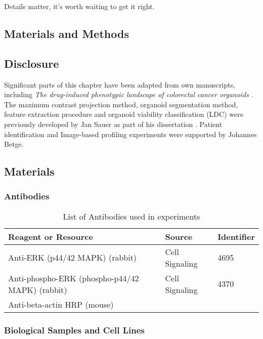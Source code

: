 \begin{savequote}[75mm]
Details matter, it’s worth waiting to get it right.
\end{savequote}

\begin{flushleft}

\chapter{Materials and Methods}

\section{Disclosure}
Significant parts of this chapter have been adapted from own manuscripts, including \textit{The drug-induced phenotypic landscape of colorectal cancer organoids} \cite{Betge2022-kr}. The maximum contrast projection method, organoid segmentation method, feature extraction procedure and organoid viability classification (LDC) were previously developed by Jan Sauer as part of his dissertation \cite{noauthor_undated-ij}. Patient identification and Image-based profiling experiments were supported by Johannes Betge. 

\section{Materials}

\subsection{Antibodies}
\begin{table}[htb]
\caption{List of Antibodies used in experiments}
\label{tab:antibodies} %
\begin{tabularx}{\textwidth}{Xll}
\toprule
\textbf{Reagent or Resource} & \textbf{Source} & \textbf{Identifier} \\
\midrule
Anti-ERK (p44/42 MAPK) (rabbit) & Cell Signaling & 4695 \\
Anti-phospho-ERK (phospho-p44/42 MAPK) (rabbit) & Cell Signaling & 4370 \\
Anti-beta-actin HRP (mouse) &  &  \\
\bottomrule
\end{tabularx}
\end{table}


\subsection{Biological Samples and Cell Lines}



\end{flushleft}

